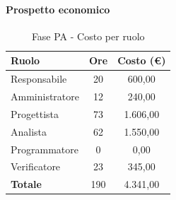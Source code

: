 \documentclass[../PianoProgetto.tex]{subfiles}
\begin{document}
	\paragraph{Prospetto economico}
					
	\begin{table}[h]
		\centering
	
		\begin{tabular}{l * {2}{c}}
			\toprule
			\textbf{Ruolo} & \textbf{Ore} & \textbf{Costo (\euro{})} \\
			\midrule
			Responsabile &	20 & 600,00 \\
			Amministratore & 12 & 240,00 \\
			Progettista & 73 & 1.606,00 \\
			Analista & 62 & 1.550,00 \\
			Programmatore & 0 & 0,00 \\
			Verificatore & 23 & 345,00 \\
			\midrule		
			\textbf{Totale} & 190 & 4.341,00 \\
			\bottomrule
		\end{tabular}
		\caption{Fase PA - Costo per ruolo}
		\label{tab:fasePA_costo}
	\end{table}
\vfill	
	
\end{document}
